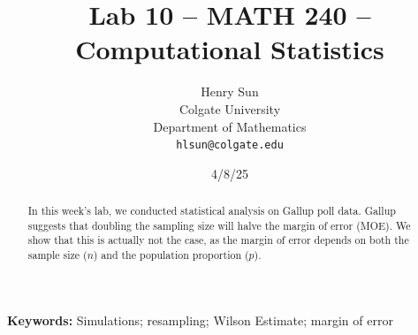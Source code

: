 \documentclass{article}\usepackage[]{graphicx}\usepackage[]{xcolor}
\begin{document}
\raggedcolumns

\vspace{-1in}
\title{Lab 10 -- MATH 240 -- Computational Statistics}

\author{
  Henry Sun \\
  Colgate University  \\
  Department of Mathematics  \\
  {\tt hlsun@colgate.edu}
}

\date{4/8/25}

\maketitle

\begin{multicols}{2}
\begin{abstract}
In this week's lab, we conducted statistical analysis on Gallup poll data. Gallup suggests that doubling the sampling size will halve the margin of error (MOE). We show that this is actually not the case, as the margin of error depends on both the sample size ($n$) and the population proportion ($p$).
\end{abstract}

\noindent \textbf{Keywords:} Simulations; resampling; Wilson Estimate; margin of error

\end{multicols}
\end{document}
